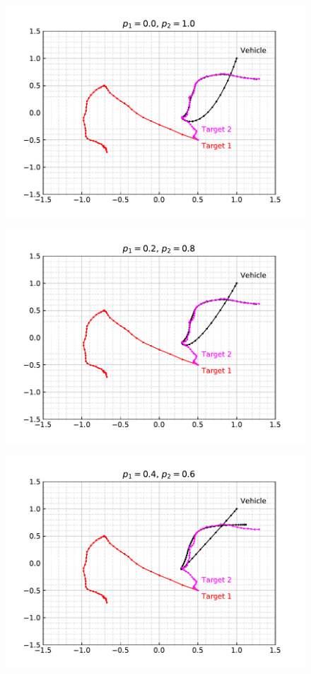 \documentclass[12pt]{article}
\begin{document}
\begin{figure}[H]
    \centering
    \includegraphics{../../src/task_4/output/ex_4_i=1.pdf}
\end{figure}

\begin{figure}[H]
    \centering
    \includegraphics{../../src/task_4/output/ex_4_i=2.pdf}
\end{figure}

\begin{figure}[H]
    \centering
    \includegraphics{../../src/task_4/output/ex_4_i=3.pdf}
\end{figure}
\end{document}
